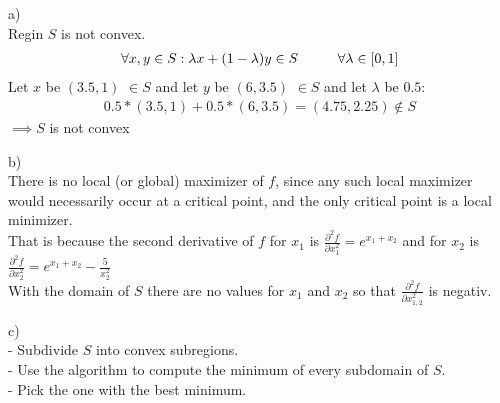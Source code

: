 %
\begin{flushleft}
a)\\
Regin $S$ is not convex.
\begin{align*}
\forall x,y \in S: \lambda x + (1-\lambda)y \in S \hspace{10mm}\forall \lambda \in [0,1]
\end{align*}
Let $x$ be $(3.5,1)$ $\in S$ and let $y$ be $(6,3.5)$ $\in S$ and let $\lambda$ be $0.5$:
\begin{align*}
0.5*(3.5,1) + 0.5*(6,3.5) = (4.75, 2.25) \notin S
\end{align*}
$\implies S$ is not convex
\end{flushleft}
\begin{flushleft}
b)\\
There is no local (or global) maximizer of $f$, since any such local maximizer would
necessarily occur at a critical point, and the only critical point is a local minimizer.\\
That is because the second derivative of $f$ for $x_1$ is $\frac{\partial^2 f}{\partial x_1^2} = e^{x_1 + x_2}$ and for $x_2$ is $\frac{\partial^2 f}{\partial x_2^2} = e^{x_1 + x_2} - \frac{5}{x_2^2}$\\
With the domain of $S$ there are no values for $x_1$ and $x_2$ so that $\frac{\partial^2 f}{\partial x_{1,2}^2}$ is negativ.
\end{flushleft}
\begin{flushleft}
c)\\
- Subdivide $S$ into convex subregions.\\
- Use the algorithm to compute the minimum of every subdomain of $S$.\\
- Pick the one with the best minimum. 
\end{flushleft}
%
%
%
%




